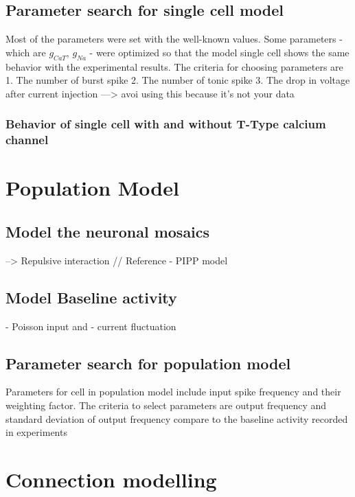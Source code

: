 
\subsection{Parameter search for single cell model}
Most of the parameters were set with the well-known values. Some parameters - which are 
$g_{CaT}$, $g_{Na}$ - were optimized so that the model single cell shows the same behavior with the experimental results. 
The criteria for choosing parameters are 
1. The number of burst spike
2. The number of tonic spike   
3. The drop in voltage after current injection
---> avoi using this because it's not your data




\subsubsection{Behavior of single cell with and without T-Type calcium channel}


\section{Population Model}
\subsection{Model the neuronal mosaics}
 --> Repulsive interaction  // Reference - PIPP model 
 \subsection{Model Baseline activity}
 - Poisson input 
 and 
 - current fluctuation 
 \subsection{Parameter search for population model}
 Parameters for cell in population model include input spike frequency and their weighting factor. 
 The criteria to select parameters are output frequency and standard deviation of output frequency compare to the baseline activity recorded in experiments


\section{Connection modelling }

